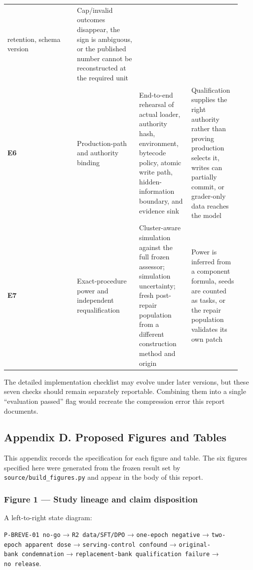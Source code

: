 \documentclass[
]{article}
\begin{document}
{\begin{longtable}[]{@{}p{0.28\linewidth}p{0.25\linewidth}p{0.21\linewidth}p{0.20\linewidth}@{}}
retention, schema version & Cap/invalid outcomes disappear, the sign is
ambiguous, or the published number cannot be reconstructed at the
required unit \\
\textbf{E6} & Production-path and authority binding & End-to-end
rehearsal of actual loader, authority hash, environment, bytecode
policy, atomic write path, hidden-information boundary, and evidence
sink & Qualification supplies the right authority rather than proving
production selects it, writes can partially commit, or grader-only data
reaches the model \\
\textbf{E7} & Exact-procedure power and independent requalification &
Cluster-aware simulation against the full frozen assessor; simulation
uncertainty; fresh post-repair population from a different construction
method and origin & Power is inferred from a component formula, seeds
are counted as tasks, or the repair population validates its own
patch \\
\end{longtable}
}

The detailed implementation checklist may evolve under later versions,
but these seven checks should remain separately reportable. Combining
them into a single ``evaluation passed'' flag would recreate the
compression error this report documents.

\subsection{Appendix D. Proposed Figures and
Tables}\label{appendix-d-proposed-figures-and-tables}

This appendix records the specification for each figure and table. The
six figures specified here were generated from the frozen result set by
\texttt{source/build\_figures.py} and appear in the body of this report.

\subsubsection{Figure 1 --- Study lineage and claim
disposition}\label{figure-1--study-lineage-and-claim-disposition}

A left-to-right state diagram:

\texttt{P-BREVE-01\ no-go} → \texttt{R2\ data/SFT/DPO} →
\texttt{one-epoch\ negative} → \texttt{two-epoch\ apparent\ dose} →
\texttt{serving-control\ confound} →
\texttt{original-bank\ condemnation} →
\texttt{replacement-bank\ qualification\ failure} →
\texttt{no\ release}.
\end{document}
